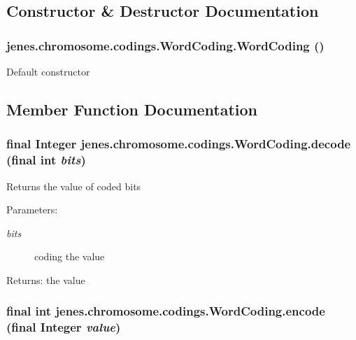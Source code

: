\subsection{Constructor \& Destructor Documentation}
\hypertarget{classjenes_1_1chromosome_1_1codings_1_1_word_coding_d9cfa1bcd3dff5005c5fcbd3878777f5}{
\subsubsection[WordCoding]{\setlength{\rightskip}{0pt plus 5cm}jenes.chromosome.codings.WordCoding.WordCoding ()}}
\label{classjenes_1_1chromosome_1_1codings_1_1_word_coding_d9cfa1bcd3dff5005c5fcbd3878777f5}


Default constructor 

\subsection{Member Function Documentation}
\hypertarget{classjenes_1_1chromosome_1_1codings_1_1_word_coding_f92b18ee4d82fabeeadf6bb31a61bee6}{
\subsubsection[decode]{\setlength{\rightskip}{0pt plus 5cm}final Integer jenes.chromosome.codings.WordCoding.decode (final int {\em bits})}}
\label{classjenes_1_1chromosome_1_1codings_1_1_word_coding_f92b18ee4d82fabeeadf6bb31a61bee6}


Returns the value of coded bits

\begin{Desc}
\item[Parameters:]
\begin{description}
\item[{\em bits}]coding the value \end{description}
\end{Desc}
\begin{Desc}
\item[Returns:]the value \end{Desc}
\hypertarget{classjenes_1_1chromosome_1_1codings_1_1_word_coding_867ca05daba5c08785ec92abc93c586d}{
\subsubsection[encode]{\setlength{\rightskip}{0pt plus 5cm}final int jenes.chromosome.codings.WordCoding.encode (final Integer {\em value})}}
\label{classjenes_1_1chromosome_1_1codings_1_1_word_coding_867ca05daba5c08785ec92abc93c586d}


